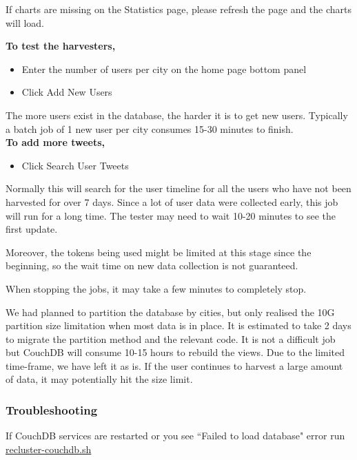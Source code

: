 If charts are missing on the Statistics page, please refresh the page and the charts will load. 

\textbf{To test the harvesters,}

\begin{itemize}
    \item Enter the number of users per city on the home page bottom panel
    \item Click Add New Users
\end{itemize}

The more users exist in the database, the harder it is to get new users. Typically a batch job of 1 new user per city consumes 15-30 minutes to finish.\\

\textbf{To add more tweets,}

\begin{itemize}
    \item Click Search User Tweets
\end{itemize}

Normally this will search for the user timeline for all the users who have not been harvested for over 7 days. Since a lot of user data were collected early, this job will run for a long time. The tester may need to wait 10-20 minutes to see the first update. 

Moreover, the tokens being used might be limited at this stage since the beginning, so the wait time on new data collection is not guaranteed. 

When stopping the jobs, it may take a few minutes to completely stop. 

We had planned to partition the database by cities, but only realised the 10G partition size limitation when most data is in place. It is estimated to take 2 days to migrate the partition method and the relevant code. It is not a difficult job but CouchDB will consume 10-15 hours to rebuild the views. Due to the limited time-frame, we have left it as is. If the user continues to harvest a large amount of data, it may potentially hit the size limit. 


\subsubsection{Troubleshooting}

If CouchDB services are restarted or you see ``Failed to load database" error run \href{https://bitbucket.org/comp90024team39/comp90024-a2/src/master/deployment/recluster-couchdb.sh}{recluster-couchdb.sh} 

